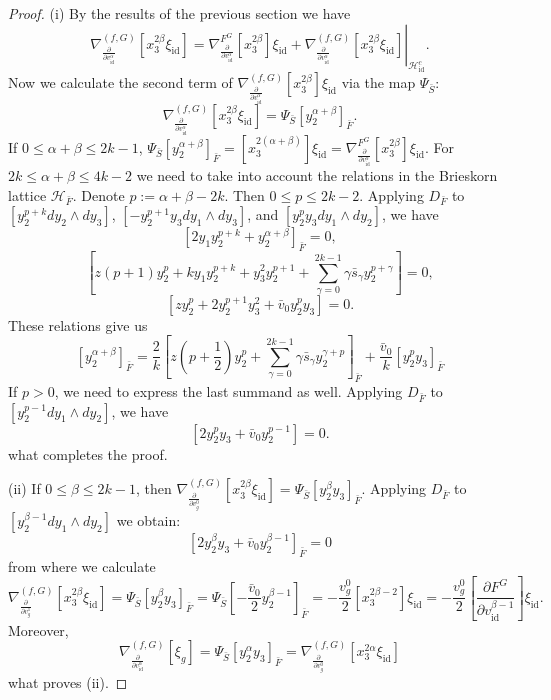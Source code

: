 \documentclass[reqno,12pt]{amsart}
\numberwithin{equation}{section}
\theoremstyle{plain}
\theoremstyle{definition}
\newcommand{\id}{\mathrm{id}}
\def\H{{\mathcal H}}
\numberwithin{equation}{section}
\begin{document}
\begin{proof}

 (i) By the results of the previous section we have
\[
 \nabla_{\frac{\partial}{\partial v^\alpha_{\id}}}^{(f,G)}[x_3^{2\beta}\xi_{\id}] = \nabla^{F^G}_{\frac{\partial}{\partial v^\alpha_{\id}}}[x_3^{2\beta}]\xi_{\id} + \left.\nabla_{\frac{\partial}{\partial v^\alpha_{\id}}}^{(f,G)}[x_3^{2\beta}\xi_{\id}]\right\vert_{\H_{\id}^c}.
\]
Now we calculate the second term of $\nabla_{\frac{\partial}{\partial v^\alpha_{\id}}}^{(f,G)}[x_3^{2\beta}]\xi_{\id}$ via the map $\Psi_{\bar{S}}$:
\[
\nabla_{\frac{\partial}{\partial v^\alpha_{\id}}}^{(f,G)}[x_3^{2\beta}\xi_{\id}] = \Psi_{\bar{S}}[y_2^{\alpha+\beta}]_{\bar{F}}.
\]
If $0 \le \alpha+\beta \le 2k-1$, $\Psi_{\bar{S}} [y_2^{\alpha+\beta}]_{\bar{F}} = [x_3^{2(\alpha+\beta)}]\xi_{\id} = \nabla^{F^G}_{\frac{\partial}{\partial v^\alpha_\id}}[x_3^{2\beta}]\xi_{\id}$. For $2k \le \alpha+\beta \le 4k-2$ we need to take into account the relations in the Brieskorn lattice $\H_{\bar F}$. Denote $p := \alpha+\beta - 2k$. Then $0 \le p \le 2k-2$. Applying $D_{\bar{F}}$ to $[y_2^{p+k}dy_2\wedge dy_3]$, $[-y_2^{p+1}y_3dy_1\wedge dy_3]$, and $[y_2^{p}y_3 dy_1 \wedge dy_2]$, we have
\[
 [2y_1y_2^{p+k} + y_2^{\alpha+\beta}]_{\bar{F}} = 0,
 \]
 \[
 [z(p+1)y_2^{p} + ky_1y_2^{p+k} + y_3^{2}y_2^{p+1} + \sum_{\gamma = 0}^{2k-1}\gamma \bar{s}_\gamma y_2^{p+\gamma }] = 0,
 \]
 \[
 [z y_2^{p} +2y_2^{p+1}y_3^2 + \bar{v}_0y_2^{p}y_3] = 0.
 \]
 These relations give us
 \[
 [y_2^{\alpha+\beta}]_{\bar{F}} = \frac{2}{k}[z(p + \frac{1}{2}) y_2^{p}+\sum_{\gamma = 0}^{2k-1}\gamma\bar{s}_\gamma y_2^{\gamma +p}]_{\bar{F}} + \frac{\bar{v}_{0}}{k}[y_2^{p}y_3]_{\bar{F}}
 \]
If $p > 0$, we need to express the last summand as well. Applying $D_{\bar F}$ to $[y_2^{p-1}dy_1\wedge dy_2]$, we have
  \[
 [2y_2^{p}y_3 + \bar{v}_0y_2^{p-1}] = 0.
 \]
 what completes the proof.

(ii) If $0\leq \beta \leq 2k-1$, then $\nabla_{\frac{\partial}{\partial v^0_{g}}}^{(f,G)}[x_3^{2\beta}\xi_{\id}] = \Psi_{\bar{S}}[y_2^{\beta}y_3]_{\bar{F}}$. Applying $D_{\bar{F}}$ to $[y_2^{\beta-1}dy_1\wedge dy_2]$ we obtain:
\[
[2y_2^\beta y_3 + \bar{v}_0 y_2^{\beta-1}]_{\bar{F}} = 0
\]
from where we calculate
\[
\nabla_{\frac{\partial}{\partial v^1_{g}}}^{(f,G)}[x_3^{2\beta}\xi_{\id}] = \Psi_{\bar{S}}[y_2^{\beta}y_3]_{\bar{F}} = \Psi_{\bar{S}}[-\frac{\bar{v}_0}{2}y_2^{\beta-1}]_{\bar{F}} = - \frac{v_g^0}{2}[x_3^{2\beta-2}]\xi_{\id} =  - \frac{v_g^0}{2}\left[\frac{\partial F^G}{\partial v^{\beta-1}_{\id}}\right]\xi_{\id}.
\]
Moreover,
\[ 
\nabla_{\frac{\partial}{\partial v^\alpha_{\id}}}^{(f,G)}[\xi_g] = \Psi_{\bar{S}}[y_2^{\alpha}y_3]_{\bar{F}} = 
\nabla_{\frac{\partial}{\partial v^0_{g}}}^{(f,G)}[x_3^{2\alpha}\xi_{\id}]  
\]
what proves (ii).


\end{proof}
\end{document}
